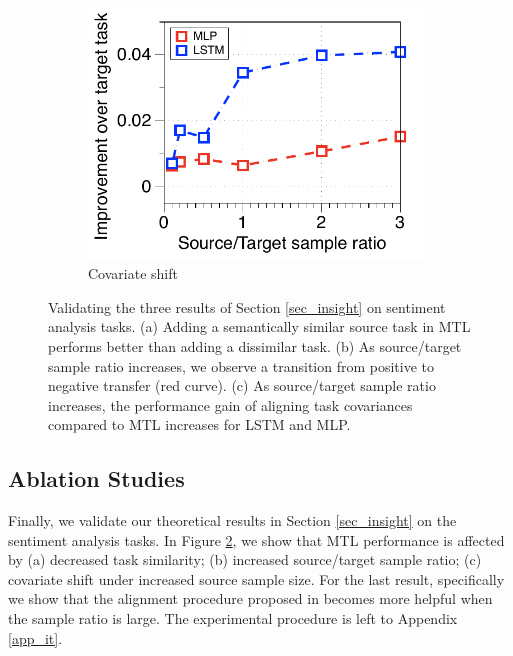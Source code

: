 \begin{figure}[!t]
\begin{subfigure}[b]{0.33\textwidth}
		\includegraphics[width=0.975\textwidth]{figures/ratio_alignment_norm_diff_all.pdf}
		\caption{Covariate shift}
		\label{fig_ab_cov}
	\end{subfigure}
	\caption{Validating the three results of Section \ref{sec_insight} on sentiment analysis tasks. (a) Adding a semantically similar source task in MTL performs better than adding a dissimilar task.
	(b) As source/target sample ratio increases, we observe a transition from positive to negative transfer (red curve).
	(c) As source/target sample ratio increases, the performance gain of aligning task covariances \cite{WZR20} compared to MTL increases for LSTM and MLP.}
	\label{fig_ablation}
	\vspace{-0.15in}
\end{figure}


\subsection{Ablation Studies}



Finally, we validate our theoretical results in Section \ref{sec_insight} on the sentiment analysis tasks.
In Figure \ref{fig_ablation}, we show that MTL performance is affected by
(a) decreased task similarity;
(b) increased source/target sample ratio;
(c) covariate shift under increased source sample size.
For the last result, specifically we show that the alignment procedure proposed in \cite{WZR20} becomes more helpful when the sample ratio is large.
The experimental procedure is left to Appendix \ref{app_it}.


